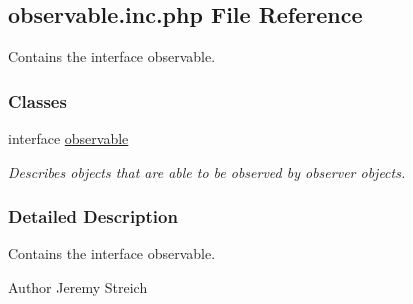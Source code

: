 \hypertarget{observable_8inc_8php}{\subsection{observable.\-inc.\-php File Reference}
\label{observable_8inc_8php}
}


Contains the interface observable.  


\subsubsection*{Classes}
\begin{DoxyCompactItemize}
\item 
interface \hyperlink{interfaceobservable}{observable}
\begin{DoxyCompactList}\small\item\em Describes objects that are able to be observed by observer objects. \end{DoxyCompactList}\end{DoxyCompactItemize}


\subsubsection{Detailed Description}
Contains the interface observable. \begin{DoxyAuthor}{Author}
Jeremy Streich 
\end{DoxyAuthor}
